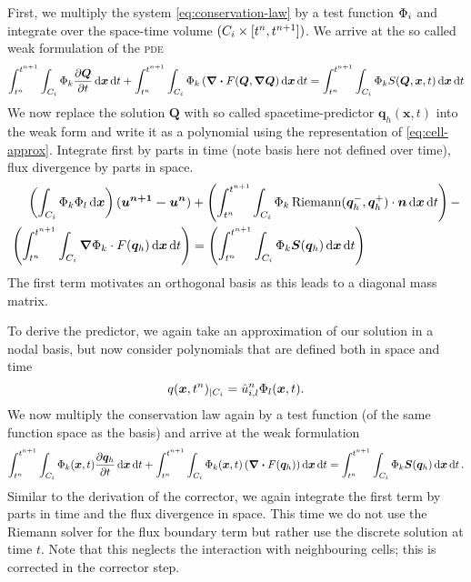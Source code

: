 \newcommand{\dsol}[1][h]{\bm{u}_{#1}}
\newcommand{\stpredictor}[1][h]{\bm{q}_{#1}}
First, we multiply the system \cref{eq:conservation-law} by a test function $\Phi_{i}$ and integrate over the space-time volume $(C_{i} \times [t^n, t^{n+1}])$.
We arrive at the so called weak formulation of the \textsc{pde} 
\begin{equation}
  \label{eq:weak-pde}
\intdt{\intdcell{
\testfunction{k} \pdv{\Q}{t}
}}
+
\intdt{\intdcell{
    \testfunction{k} \left( \div{F(\Q, \gradQ} \right)
}}
=
\intdt{\intdcell{
    \testfunction{k} S(\Q, \bm{x}, t)
}}
\end{equation}
We now replace the solution $\bm{Q}$ with so called spacetime-predictor $\stpredictor (\bm{x},t)$ into the weak form and write it as a polynomial using the representation of \cref{eq:cell-approx}.
Integrate first by parts in time (note basis here not defined over time), flux divergence by parts in space.
\begin{align}
\begin{split}
\label{eq:corrector}
\left(
\intdcell{
  \testfunction{k} \sbasis{l}
}
\right)
(\bm{u^{n+1} - u^{n}})
&+
\left(\intdt{\intdcell{
      \testfunction{k} \Riemann(\stpredictor^-, \stpredictor^+) \cdot \normal
}}\right)
-\\
\left(\intdt{\intdcell{
    \gradient{\testfunction{k}} \cdot  \flux(\stpredictor)
}}\right)
&=
\left(\intdt{\intdcell{
      \testfunction{k} \source(\stpredictor)
}}\right)
\end{split}
\end{align}
The first term motivates an orthogonal basis as this leads to a diagonal mass matrix.

To derive the predictor, we again take an approximation of our solution in a nodal basis, but now consider polynomials that are defined both in space and time
\begin{equation}
  \label{eq:cell-approx-space-time}
  q(\bm{x}, t^n)_{|\cell[i]} = \hat{u}^n_{i,l} \stbasis{l}(\bm{x}, t).
\end{equation}
We now multiply the conservation law again by a test function (of the same function space as the basis) and arrive at the weak formulation
\begin{equation}\label{eq:weak-pde-space-time}
\intdt{\intdcell{
    \testfunction{k}(\bm{x}, t)
    \pdv{\stpredictor}{t}
}}
+
\intdt{\intdcell{
    \testfunction{k}(\bm{x}, t)
    \left(
      \divergence{\flux(\stpredictor)}
    \right)
}}
=
\intdt{\intdcell{
  \testfunction{k} \source(\stpredictor)
}}.
\end{equation}
Similar to the derivation of the corrector, we again integrate the first term by parts in time and the flux divergence in space.
This time we do not use the Riemann solver for the flux boundary term but rather use the discrete solution at time $t$.
Note that this neglects the interaction with neighbouring cells; this is corrected in the corrector step.

